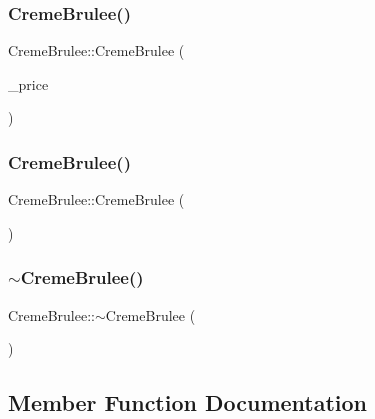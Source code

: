 \subsubsection{\texorpdfstring{CremeBrulee()}{CremeBrulee()}\hspace{0.1cm}{\footnotesize\ttfamily [1/2]}}
{\footnotesize\ttfamily Creme\+Brulee\+::\+Creme\+Brulee (\begin{DoxyParamCaption}\item[{int}]{\+\_\+price }\end{DoxyParamCaption})}

\mbox{\label{classCremeBrulee_a4dc602826d91ee2ec968a25564fd650d}} 
\subsubsection{\texorpdfstring{CremeBrulee()}{CremeBrulee()}\hspace{0.1cm}{\footnotesize\ttfamily [2/2]}}
{\footnotesize\ttfamily Creme\+Brulee\+::\+Creme\+Brulee (\begin{DoxyParamCaption}\item[{const \mbox{\hyperlink{classCremeBrulee}{Creme\+Brulee}} \&}]{ }\end{DoxyParamCaption})}

\mbox{\label{classCremeBrulee_af94661af8aa10067b6358d4beb94cf70}} 
\subsubsection{\texorpdfstring{$\sim$CremeBrulee()}{~CremeBrulee()}}
{\footnotesize\ttfamily Creme\+Brulee\+::$\sim$\+Creme\+Brulee (\begin{DoxyParamCaption}{ }\end{DoxyParamCaption})}



\subsection{Member Function Documentation}
\mbox{\label{classCremeBrulee_aa1b2e48f56c6cb0efe5a905a77c2e74d}} 
